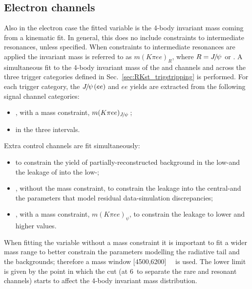 \clearpage

\subsection{Electron channels}
\label{sec:RKst_fit_ee}

Also in the electron case the fitted variable is the 4-body invariant mass coming from a kinematic fit.
In general, this does no include constraints to intermediate resonances, unless specified.
When constraints to intermediate resonances are applied the invariant mass is referred to as
$m(K\pi ee)_R$, where $R = \jpsi$ or \psitwos.
A simultaneous fit to the 4-body invariant mass of the \BdToKstJPsee and \BdToKstee 
channels and across the three trigger categories defined in Sec.~\ref{sec:RKst_trigstripping} is performed.
%
For each trigger category, the $\jpsi(ee)$ and $ee$ yields are extracted from the following signal channel categories:
%
\begin{itemize}
\item \BdToKstJPsee, with a \jpsi mass constraint, $m(K\pi ee)_{\jpsi}$;
\item \BdToKstee in the three \qsq intervals.
\end{itemize}

Extra control channels are fit simultaneously:
%
\begin{itemize}
\item \BdToKstGee to constrain the yield of partially-reconstructed background 
in the low-\qsq and the leakage of \BdToKstG into the low-\qsq;
\item \BdToKstJPsee, without the \jpsi mass constraint, to constrain the leakage into the central-\qsq and the 
parameters that model residual data-simulation discrepancies;
\item \BdToKstPsiee, with a \psitwos mass constraint,  $m(K\pi ee)_{\psi}$, to constrain the leakage to lower and higher \qsq values.
\end{itemize}

When fitting the variable without a \jpsi mass constraint it is important to fit a wider mass range to better constrain the 
parameters modelling the radiative tail and the backgrounds; therefore a mass window [4500,6200]~\mevcc~ is used. The lower limit 
is given by the point in which the \qsq cut (at 6~\gevgevcccc to separate the rare and resonant channels)
starts to affect the 4-body invariant mass distribution. 
%
%

